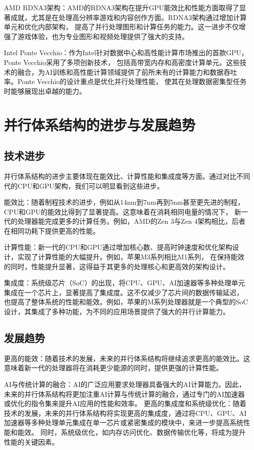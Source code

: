 \documentclass{ctexart}
\begin{document}
AMD RDNA3架构：AMD的RDNA3架构在提升GPU能效比和性能方面取得了显著成就，尤其是在处理高分辨率游戏和内容创作方面。RDNA3架构通过增加计算单元和优化内部架构，
提高了并行处理图形和计算任务的能力。这一进步不仅增强了游戏体验，也为专业图形和视频处理提供了强大的支持。

Intel Ponte Vecchio：作为Intel针对数据中心和高性能计算市场推出的首款GPU，Ponte Vecchio采用了多项创新技术，
包括高带宽内存和高密度计算单元。这些技术的融合，为AI训练和高性能计算领域提供了前所未有的计算能力和数据吞吐率。Ponte Vecchio的设计重点是优化并行处理性能，
使其在处理数据密集型任务时能够展现出卓越的能力。
\section{并行体系结构的进步与发展趋势}
\subsection{技术进步}
并行体系结构的进步主要体现在能效比、计算性能和集成度等方面。通过对比不同代的CPU和GPU架构，我们可以明显看到这些进步。

能效比：随着制程技术的进步，例如从14nm到7nm再到5nm甚至更先进的制程，CPU和GPU的能效比得到了显著提高。这意味着在消耗相同电量的情况下，
新一代的处理器能完成更多的计算任务。例如，AMD的Zen 3与Zen 4架构相比，后者在相同功耗下提供更高的性能。

计算性能：新一代的CPU和GPU通过增加核心数、提高时钟速度和优化架构设计，实现了计算性能的大幅提升。例如，苹果M3系列相比M1系列，
在保持能效的同时，性能提升显著，这得益于其更多的处理核心和更高效的架构设计。

集成度：系统级芯片（SoC）的出现，将CPU、GPU、AI加速器等多种处理单元集成在一个芯片上，显著提高了集成度。这不仅减少了芯片间的数据传输延迟，
也提高了整体系统的性能和能效。例如，苹果的M系列处理器就是一个典型的SoC设计，其集成了多种功能，为不同的应用场景提供了强大的并行计算能力。
\subsection{发展趋势}
更高的能效：随着技术的发展，未来的并行体系结构将继续追求更高的能效比。这意味着新一代的处理器将在消耗更少能源的同时，提供更强的计算性能。

AI与传统计算的融合：AI的广泛应用要求处理器具备强大的AI计算能力。因此，未来的并行体系结构将更加注重AI计算与传统计算的融合，通过专门的AI加速器或优化的指令集来提升AI应用的性能和效率。
更高的集成度和系统级优化：随着技术的发展，未来的并行体系结构将实现更高的集成度，通过将CPU、GPU、AI加速器等多种处理单元集成在单一芯片或紧密集成的模块中，来进一步提高系统性能和能效。
同时，系统级优化，如内存访问优化、数据传输优化等，将成为提升性能的关键因素。
\end{document}
